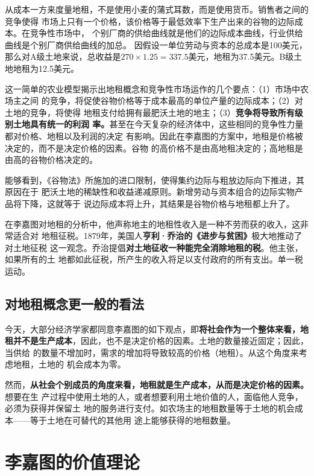 从成本一方来度量地租，不是使用小麦的蒲式耳数，而是使用货币。销售者之间的竞争使得
市场上只有一个价格，该价格等于最低效率下生产出来的谷物的边际成本。在竞争性市场中，
个别厂商的供给曲线就是他们的边际成本曲线，行业供给曲线是个别厂商供给曲线的加总。
因假设一单位劳动与资本的总成本是100美元，那么对A级土地来说，总收益是$270 \times
1.25 = 337.5$美元，地租为37.5美元。B级土地地租为12.5美元。

这一简单的农业模型揭示出地租概念和竞争性市场运作的几个要点：（1）市场中农场主之间
的竞争，将促使谷物价格等于成本最高的单位产量的边际成本；（2）对土地的竞争，将使得
地租支付给拥有最肥沃土地的地主；（3）\textbf{竞争将导致所有级别土地具有统一的利润
  率。}甚至在今天复杂的经济体中，这些相同的竞争性力量都对价格、地租以及利润的决定
有影响。因此在李嘉图的方案中，地租是价格被决定的，而不是决定价格的因素。谷物
的高价格不是由高地租决定的；高地租是由高的谷物价格决定的。

能够看到，《谷物法》所施加的进口限制，使得集约边际与粗放边际向下推进，其原因在于
肥沃土地的稀缺性和收益递减原则。新增劳动与资本组合的边际实物产品将下降，这就等于
说边际成本将上升，其结果是谷物价格与地租都上升了。

在李嘉图对地租的分析中，他声称地主的地租性收入是一种不劳而获的收入，这非常适合对
地租征税。1879年，美国人\textbf{亨利·乔治的《进步与贫困》}极大地推动了对土地征税
这一观念。乔治提倡\textbf{对土地征收一种能完全消除地租的税}。他主张，如果所有的土
地都如此征税，所产生的收入将足以支付政府的所有支出。单一税运动。

\subsection{对地租概念更一般的看法}

今天，大部分经济学家都同意李嘉图的如下观点，即\textbf{将社会作为一个整体来看，地
  租并不是生产成本}，因此，也不是决定价格的因素。土地的数量接近固定；因此，当供给
的数量不增加时，需求的增加将导致较高的价格（地租）。从这个角度来考虑地租，土地的
机会成本为零。

然而，\textbf{从社会个别成员的角度来看，地租就是生产成本，从而是决定价格的因素。}想要在生
产过程中使用土地的人，或者想要利用土地价值的人，面临他人竞争，必须为获得并保留土
地的服务进行支付。如农场主的地租数量等于土地的机会成本——等于土地在可替代的其他用
途上能够获得的地租数量。

\section{李嘉图的价值理论}

